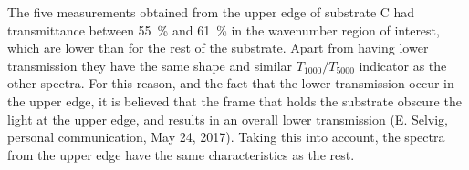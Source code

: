 The five measurements obtained from the upper edge of substrate C had transmittance between \SI{55}{\percent} and \SI{61}{\percent} in the wavenumber region of interest, which are lower than for the rest of the substrate. Apart from having lower transmission they have the same shape and similar $T_{1000}/T_{5000}$ indicator as the other spectra. For this reason, and the fact that the lower transmission occur in the upper edge, it is believed that the frame that holds the substrate obscure the light at the upper edge, and results in an overall lower transmission (E. Selvig, personal communication, May 24, 2017). Taking this into account, the spectra from the upper edge have the same characteristics as the rest.



